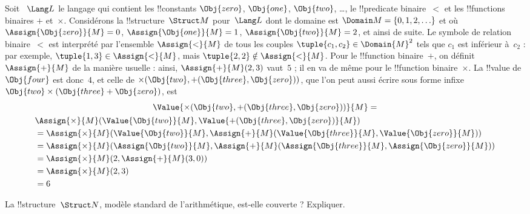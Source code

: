 \documentclass[../../../include/open-logic-section]{subfiles}
\begin{document}
\begin{ex}
Soit ~$\Lang L$ le langage qui contient les !!{constant}s
$\Obj{zero}$, $\Obj{one}$, $\Obj{two}$, \dots, le !!{predicate}
binaire~$<$ et les !!{function}s binaires $+$ et~$\times$.
Considérons la !!{structure}~$\Struct M$ pour~$\Lang L$ dont le
domaine est $\Domain M = \{0, 1, 2, \ldots \}$ et où
$\Assign{\Obj{zero}}{M} = 0$,
$\Assign{\Obj{one}}{M} = 1$, $\Assign{\Obj{two}}{M} = 2$, et ainsi
de suite. Le symbole de relation binaire~$<$ est interprété par
l'ensemble $\Assign{<}{M}$ de tous les couples
$\tuple{c_1, c_2} \in \Domain{M}^2$ tels que $c_1$ est inférieur
à~$c_2$ : par exemple,
$\tuple{1, 3} \in \Assign{<}{M}$, mais
$\tuple{2, 2} \notin \Assign{<}{M}$. Pour le !!{function} binaire~$+$,
on définit $\Assign{+}{M}$ de la manière usuelle : ainsi,
$\Assign{+}{M}(2,3)$ vaut~$5$ ; il en va de même pour le
!!{function} binaire~$\times$. La !!{value} de $\Obj{four}$ est
donc~$4$, et celle de
$\times(\Obj{two}, +(\Obj{three},\Obj{zero}))$, que l'on peut aussi
écrire sous forme infixe
$\Obj{two} \times (\Obj{three} + \Obj{zero})$, est
\begin{multline*}
\Value{\times(\Obj{two}, +(\Obj{three},\Obj{zero}))}{M} =\\
\begin{aligned}
& \Assign{\times}{M}(\Value{\Obj{two}}{M}, \Value{+(\Obj{three}, \Obj{zero})}{M})\\
& = \Assign{\times}{M}(\Value{\Obj{two}}{M}, \Assign{+}{M}(\Value{\Obj{three}}{M},
\Value{\Obj{zero}}{M})) \\
& = \Assign{\times}{M}(\Assign{\Obj{two}}{M}, \Assign{+}{M}(\Assign{\Obj{three}}{M},
\Assign{\Obj{zero}}{M})) \\
& = \Assign{\times}{M}(2, \Assign{+}{M}(3, 0)) \\
& = \Assign{\times}{M}(2, 3) \\
& = 6
\end{aligned}
\end{multline*}
\end{ex}

\begin{prob}
La !!{structure}~$\Struct N$, modèle standard de l'arithmétique,
est-elle couverte ? Expliquer.
\end{prob}
\end{document}
